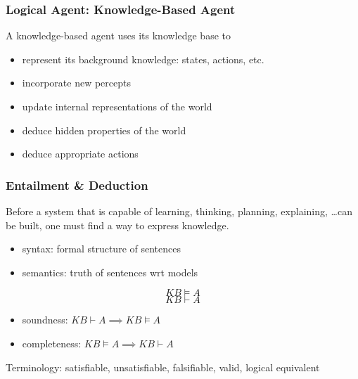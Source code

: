 \documentclass[UTF8,11pt,colorlinks,compress,openany]{beamer}%
\begin{document}
\begin{frame}\frametitle{Logical Agent: Knowledge-Based Agent}
\begin{figure}[H]
\end{figure}
A knowledge-based agent uses its knowledge base to
\begin{itemize}
	\item represent its background knowledge: states, actions, etc.
	\item incorporate new percepts
	\item update internal representations of the world
	\item deduce hidden properties of the world
	\item deduce appropriate actions
\end{itemize}
\end{frame}

\begin{frame}\frametitle{Entailment \& Deduction}
Before a system that is capable of learning, thinking, planning, explaining, \dots can be built, one must find a way to express knowledge.
\begin{itemize}
	\item syntax: formal structure of sentences
	\item semantics: truth of sentences wrt models
\end{itemize}
\[KB\vDash A\]
\[KB\vdash A\]
\begin{itemize}
	\item soundness: $KB\vdash A\implies KB\vDash A$
	\item completeness: $KB\vDash A\implies KB\vdash A$
\end{itemize}
Terminology: satisfiable, unsatisfiable, falsifiable, valid, logical equivalent
\end{frame}
\end{document}
